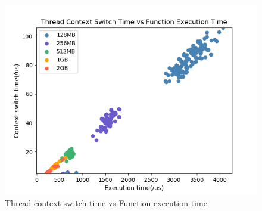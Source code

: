 \begin{figure}
	\centering
	\includegraphics[width=\linewidth]{figure/cxt_vs_exe.png}
	\caption{Thread context switch time vs Function execution time}
	\label{fig:cxt_exe}
\end{figure}
